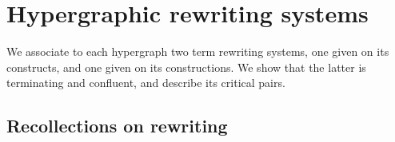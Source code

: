 
\section{Hypergraphic rewriting systems} 
\label{s:rewriting}

We associate to each hypergraph two term rewriting systems, one given on its constructs, and one given on its constructions.
We show that the latter is terminating and confluent, and describe its critical pairs. 


\subsection{Recollections on rewriting} \label{recollection-section}

